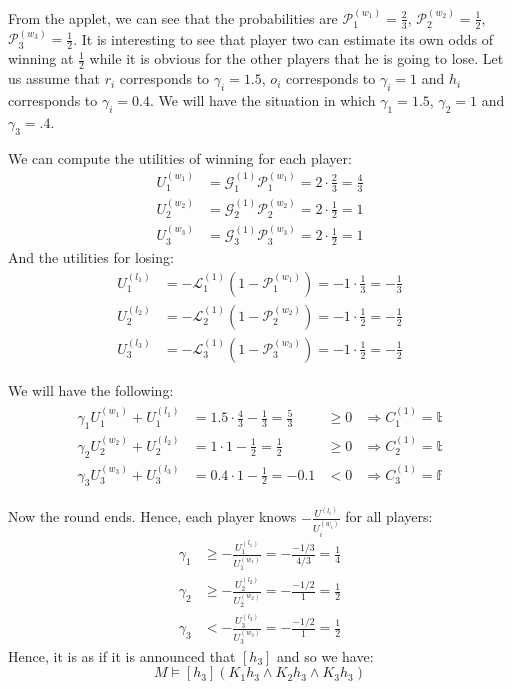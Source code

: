 \documentclass[a4paper,10pt]{article}
\begin{document}
From the applet, we can see that the probabilities are $\mathcal{P}^{(w_1)}_1=\frac{2}{3}$, $\mathcal{P}^{(w_2)}_2=\frac{1}{2}$, $\mathcal{P}^{(w_3)}_3 = \frac{1}{2}$. It is interesting to see that player two can estimate its own odds of winning at $\frac{1}{2}$ while it is obvious for the other players that he is going to lose. Let us assume that $r_i$ corresponds to $\gamma_i=1.5$, $o_i$ corresponds to $\gamma_i=1$ and $h_i$ corresponds to $\gamma_i=0.4$. We will have the situation in which $\gamma_1 = 1.5$, $\gamma_2 = 1$ and $\gamma_3=.4$.

We can compute the utilities of winning for each player:
\begin{align*}
 U^{(w_1)}_1 &= \mathcal G^{(1)}_1 \mathcal P^{(w_1)}_1 = 2 \cdot \frac{2}{3} = \frac{4}{3}\\
 U^{(w_2)}_2 &= \mathcal G^{(1)}_2 \mathcal P^{(w_2)}_2 = 2 \cdot \frac{1}{2} = 1\\
 U^{(w_3)}_3 &= \mathcal G^{(1)}_3 \mathcal P^{(w_3)}_3 = 2 \cdot \frac{1}{2} = 1
\end{align*}
And the utilities for losing:
\begin{align*}
 U^{(l_1)}_1 &= -\mathcal L^{(1)}_1 (1-\mathcal P^{(w_1)}_1) = -1\cdot \frac{1}{3} = -\frac{1}{3}\\
 U^{(l_2)}_2 &= -\mathcal L^{(1)}_2 (1-\mathcal P^{(w_2)}_2) = -1\cdot \frac{1}{2} = -\frac{1}{2}\\
 U^{(l_3)}_3 &= -\mathcal L^{(1)}_3 (1-\mathcal P^{(w_3)}_3) = -1 \cdot \frac{1}{2} = -\frac{1}{2}
\end{align*}

We will have the following:
\begin{align*}
\begin{array}{clll}
 \gamma_1 U^{(w_1)}_1 + U^{(l_1)}_1 &= 1.5\cdot \frac{4}{3} - \frac{1}{3} = \frac{5}{3} &\geq 0 &\Rightarrow C^{(1)}_1 = \mathbb{t}\\
 \gamma_2 U^{(w_2)}_2 + U^{(l_2)}_2 &= 1\cdot 1 - \frac{1}{2} = \frac{1}{2} &\geq 0 &\Rightarrow C^{(1)}_2 = \mathbb{t}\\
 \gamma_3 U^{(w_3)}_3 + U^{(l_3)}_3 &= 0.4\cdot 1 - \frac{1}{2} = -0.1 &< 0 &\Rightarrow C^{(1)}_3 = \mathbb{f}
\end{array}
\end{align*}

Now the round ends. Hence, each player knows $\displaystyle -\frac{U^{(l_i)}}{U^{(w_i)}_i}$ for all players:
\begin{align*}
 \gamma_1 &\geq -\frac{U^{(l_1)}_1}{U^{(w_1)}_1} = -\frac{-1/3}{4/3}=\frac{1}{4}\\
 \gamma_2 &\geq -\frac{U^{(l_2)}_2}{U^{(w_2)}_2} = -\frac{-1/2}{1}=\frac{1}{2}\\
 \gamma_3 &< -\frac{U^{(l_3)}_3}{U^{(w_3)}_3} = -\frac{-1/2}{1}=\frac{1}{2}
\end{align*}
Hence, it is as if it is announced that $[h_3]$ and so we have:
\begin{equation}
 M \models [h_3] (K_1 h_3 \wedge K_2 h_3 \wedge K_3 h_3)
\end{equation}
\end{document}
